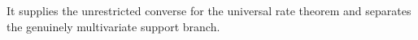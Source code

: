 It supplies the unrestricted converse for the universal rate theorem and separates the genuinely multivariate support branch.
